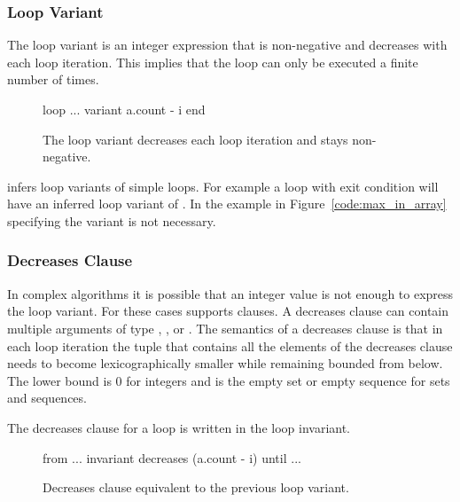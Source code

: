 \subsubsection*{Loop Variant}

The loop variant is an integer expression that is non-negative and decreases with each loop iteration. This implies that the loop can only be executed a finite number of times.

\begin{figure}
\begin{erunning}
loop ...
variant
	a.count - i
end
\end{erunning}
\hspace{0.5cm}
\caption*{The loop variant decreases each loop iteration and stays non-negative.}
\end{figure}

\AutoProof infers loop variants of simple loops. For example a loop with exit condition  will have an inferred loop variant of . In the example in Figure~\ref{code:max_in_array} specifying the variant is not necessary.

\subsubsection*{Decreases Clause}

In complex algorithms it is possible that an integer value is not enough to express the loop variant. For these cases \AutoProof supports  clauses. A decreases clause can contain multiple arguments of type , , or . The semantics of a decreases clause is that in each loop iteration the tuple that contains all the elements of the decreases clause needs to become lexicographically smaller while remaining bounded from below. The lower bound is 0 for integers and is the empty set or empty sequence for sets and sequences.

The decreases clause for a loop is written in the loop invariant.

\begin{figure}
\begin{erunning}
from ...
invariant
	decreases (a.count - i)
until ...
\end{erunning}
\hspace{0.5cm}
\caption*{Decreases clause equivalent to the previous loop variant.}
\end{figure}

